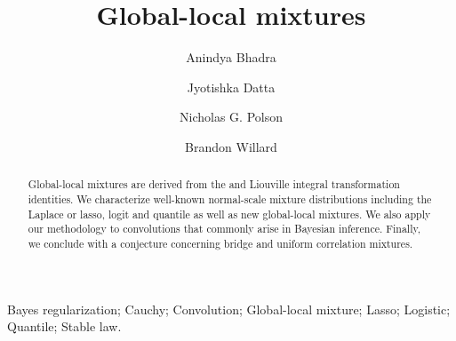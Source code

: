 \documentclass[lineno]{biometrika}
\begin{document}



\title{Global-local mixtures}

\author{Anindya Bhadra}
\author{Jyotishka Datta}
\author{Nicholas G. Polson \and Brandon Willard }


\maketitle
\begin{abstract}
  Global-local mixtures are derived from the \CS{} and Liouville integral transformation identities. We characterize well-known normal-scale mixture
  distributions including the Laplace or lasso, logit and quantile as well as new global-local mixtures. We also apply our methodology to convolutions that
  commonly arise in Bayesian inference. Finally, we conclude with a conjecture concerning bridge and uniform correlation mixtures. 
\end{abstract}

\begin{keywords}
Bayes regularization; Cauchy; Convolution; Global-local mixture; Lasso;  Logistic; Quantile; Stable law. %
\end{keywords}
\end{document}
